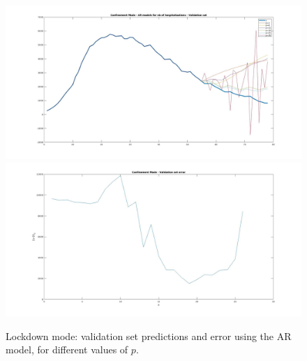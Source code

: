 \documentclass[11pt]{article}
\begin{document}
\begin{figure}[h!]
	\centering
	\includegraphics[scale=0.3]{Conf_val.jpg}
	\includegraphics[scale=0.3]{Conf_Err_Val.jpg}
	\caption{Lockdown mode: validation set predictions and error using the AR model, for different values of \(p\).}
	\label{fig:Conf_val}
\end{figure}
\end{document}
